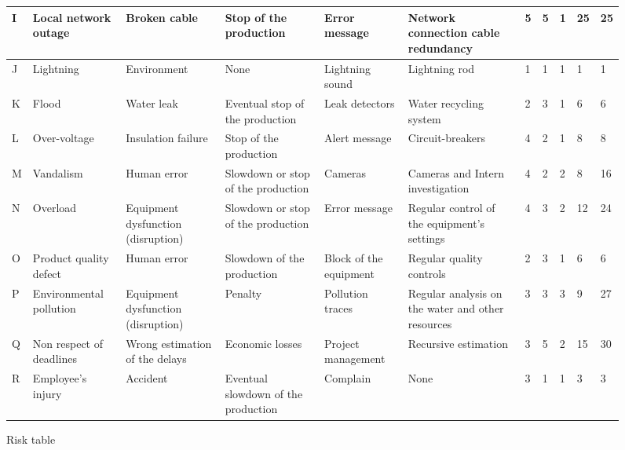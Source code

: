 \begin{landscape}
\begin{figure}[h]
{\begin{tabular}{|l|p{3cm}|p{3cm}|p{3cm}|p{3cm}|p{3cm}|l|l|l|l|l|}
\hline
I          & Local network outage       & Broken cable                       & Stop of the production              & Error message                     & Network connection cable redundancy               & 5 & 5 & 1 & 25 & 25  \\
\hline
J          & Lightning                  & Environment                        & None                                & Lightning sound                   & Lightning rod                                     & 1 & 1 & 1 & 1  & 1   \\
\hline
K          & Flood                      & Water leak                         & Eventual stop of the production     & Leak detectors                    & Water recycling system                            & 2 & 3 & 1 & 6  & 6   \\
\hline
L          & Over-voltage               & Insulation failure                 & Stop of the production              & Alert message                     & Circuit-breakers                                  & 4 & 2 & 1 & 8  & 8   \\
\hline
M          & Vandalism                  & Human error                        & Slowdown or stop of the production  & Cameras                           & Cameras and Intern investigation                  & 4 & 2 & 2 & 8  & 16  \\
\hline
N          & Overload                   & Equipment dysfunction (disruption) & Slowdown or stop of the production  & Error message                     & Regular control of the equipment’s settings       & 4 & 3 & 2 & 12 & 24  \\
\hline
O          & Product quality defect     & Human error                        & Slowdown of the production          & Block of the equipment            & Regular quality controls                          & 2 & 3 & 1 & 6  & 6   \\
\hline
P          & Environmental pollution    & Equipment dysfunction (disruption) & Penalty                             & Pollution traces                  & Regular analysis on the water and other resources & 3 & 3 & 3 & 9  & 27  \\
\hline
Q          & Non respect of deadlines   & Wrong estimation of the delays     & Economic losses                     & Project management                & Recursive estimation                              & 3 & 5 & 2 & 15 & 30  \\
\hline
R          & Employee’s injury          & Accident                           & Eventual slowdown of the production & Complain                          & None                                              & 3 & 1 & 1 & 3  & 3  \\
\hline
\end{tabular}%
}
\caption{Risk table}
\end{figure}
\end{landscape}

